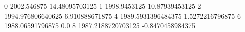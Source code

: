 0 2002.546875 14.48095703125
1 1998.9453125 10.87939453125
2 1994.976806640625 6.910888671875
4 1989.5931396484375 1.5272216796875
6 1988.06591796875 0.0
8 1987.2188720703125 -0.8470458984375
